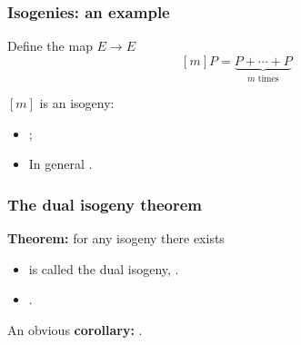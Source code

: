 \documentclass{beamer}
\renewcommand{\emph}[1]{}
\begin{document}

\begin{frame}
  \frametitle{Isogenies: an example}
  
  Define the \emph{multiplication-by-$m$} map $E\to E$
  \[[m]P = \underbrace{P + \cdots + P}_{m\text{ times}}\]
  
  $[m]$ is an isogeny:
  \begin{itemize}
  \item \emph{$\deg [m] = m^2$};
  \item In general \emph{$\ker[m] = E[m] \simeq (\Z/m\Z)^2 $}.
  \end{itemize}
\end{frame}


\begin{frame}
  \frametitle{The dual isogeny theorem}

  \textbf{Theorem:} for any isogeny \emph{$\phi:E \to E'$} there exists
  \emph{$\hat\phi$}
  
  \begin{center}
  \end{center}

  \begin{itemize}
  \item \emph{$\hat\phi$} is called the \alert{dual isogeny},
    \emph{$\deg \phi = \deg \hat{\phi} = m$}.
  \item \emph{$\hat{\hat{\phi}} = \phi$}.
  \end{itemize}
  
  An obvious \textbf{corollary:} \emph{$\phi(E[m]) = \ker\hat\phi$}.
\end{frame}

\end{document}
